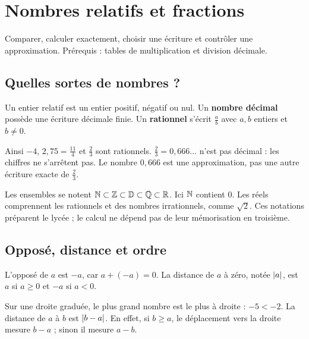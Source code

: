 \documentclass[../cours_3e.tex]{subfiles}
\begin{document}
\setcounter{chapter}{1}
\chapter{Nombres relatifs et fractions}
\label{ch:nombres}
\begin{objectif}
Comparer, calculer exactement, choisir une écriture et contrôler une approximation. Prérequis : tables de multiplication et division décimale.
\end{objectif}
\section{Quelles sortes de nombres ?}
\begin{definition}
Un entier relatif est un entier positif, négatif ou nul. Un \textbf{nombre décimal} possède une écriture décimale finie. Un \textbf{rationnel} s'écrit $\frac ab$ avec $a,b$ entiers et $b\ne0$.
\end{definition}
Ainsi $-4$, $2{,}75=\frac{11}{4}$ et $\frac23$ sont rationnels. $\frac23=0{,}666\ldots$ n'est pas décimal : les chiffres ne s'arrêtent pas. Le nombre $0{,}666$ est une approximation, pas une autre écriture exacte de $\frac23$.

\approfondissement Les ensembles se notent $\mathbb{N}\subset\mathbb{Z}\subset\mathbb{D}\subset\mathbb{Q}\subset\mathbb{R}$. Ici $\mathbb{N}$ contient $0$. Les réels comprennent les rationnels et des nombres irrationnels, comme $\sqrt2$. Ces notations préparent le lycée ; le calcul ne dépend pas de leur mémorisation en troisième.

\section{Opposé, distance et ordre}
\begin{definition}
L'opposé de $a$ est $-a$, car $a+(-a)=0$. La distance de $a$ à zéro, notée $\left|a\right|$, est $a$ si $a\geq0$ et $-a$ si $a<0$.
\end{definition}
\begin{center}
\end{center}
Sur une droite graduée, le plus grand nombre est le plus à droite : $-5<-2$. La distance de $a$ à $b$ est $\left|b-a\right|$. En effet, si $b\geq a$, le déplacement vers la droite mesure $b-a$ ; sinon il mesure $a-b$.
\end{document}
